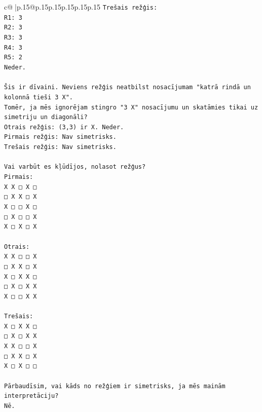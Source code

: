 \documentclass{article}
\begin{document}
{\begin{supertabular}{c@{$\;$}|p{.15\linewidth}@{}p{.15\linewidth}p{.15\linewidth}p{.15\linewidth}p{.15\linewidth}p{.15\linewidth}}
{{{\texttt{Trešais režģis:} \\
\texttt{R1: 3} \\
\texttt{R2: 3} \\
\texttt{R3: 3} \\
\texttt{R4: 3} \\
\texttt{R5: 2} \\
\texttt{Neder.} \\
\\ 
\texttt{Šis ir dīvaini. Neviens režģis neatbilst nosacījumam "katrā rindā un kolonnā tieši 3 X".} \\
\texttt{Tomēr, ja mēs ignorējam stingro "3 X" nosacījumu un skatāmies tikai uz simetriju un diagonāli?} \\
\texttt{Otrais režģis: (3,3) ir X. Neder.} \\
\texttt{Pirmais režģis: Nav simetrisks.} \\
\texttt{Trešais režģis: Nav simetrisks.} \\
\\ 
\texttt{Vai varbūt es kļūdījos, nolasot režģus?} \\
\texttt{Pirmais:} \\
\texttt{X X □ X □} \\
\texttt{□ X X □ X} \\
\texttt{X □ □ X □} \\
\texttt{□ X □ □ X} \\
\texttt{X □ X □ X} \\
\\ 
\texttt{Otrais:} \\
\texttt{X X □ □ X} \\
\texttt{□ X X □ X} \\
\texttt{X □ X X □} \\
\texttt{□ X □ X X} \\
\texttt{X □ □ X X} \\
\\ 
\texttt{Trešais:} \\
\texttt{X □ X X □} \\
\texttt{□ X □ X X} \\
\texttt{X X □ □ X} \\
\texttt{□ X X □ X} \\
\texttt{X □ X □ □} \\
\\ 
\texttt{Pārbaudīsim, vai kāds no režģiem ir simetrisks, ja mēs mainām interpretāciju?} \\
\texttt{Nē.} \\
\\ 
}}}
\end{supertabular}}
\end{document}
